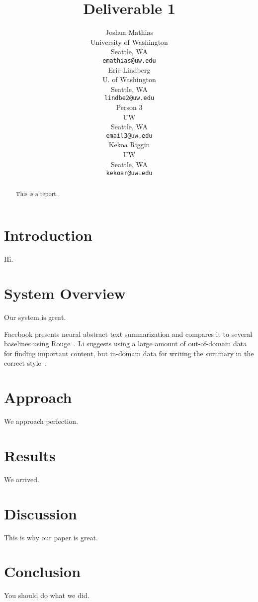 \documentclass[11pt,a4paper]{article}
\title{Deliverable 1}
\author{Joshua Mathias \\
  University of Washington \\
  Seattle, WA \\
  {\tt emathias@uw.edu} 
  \\\And 
  Eric Lindberg \\
  U. of Washington \\
  Seattle, WA \\
  {\tt lindbe2@uw.edu} 
  \\\And 
  Person 3 \\
  UW \\
  Seattle, WA \\
  {\tt email3@uw.edu} 
  \\\And 
  Kekoa Riggin \\
  UW \\
  Seattle, WA \\
  {\tt kekoar@uw.edu} 
    }
\date{}
\begin{document}
\maketitle
\begin{abstract}
This is a report.
\end{abstract}

\section{Introduction}
Hi.

\section{System Overview}
Our system is great.

Facebook presents neural abstract text summarization and compares it to several baselines using Rouge~\cite{Rush:15}. Li suggests using a large amount of out-of-domain data for finding important content, but in-domain data for writing the summary in the correct style~.

\section{Approach}
We approach perfection.

\section{Results}
We arrived.

\section{Discussion}
This is why our paper is great.

\section{Conclusion}
You should do what we did.


\end{document}
